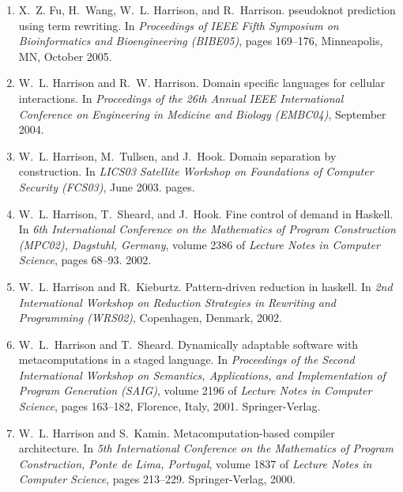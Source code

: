 \documentclass[12pt]{article} %
\begin{document}
\begin{enumerate}[leftmargin=0.0mm]
\item
X.~Z. Fu, H.~Wang, W.~L. Harrison, and R.~Harrison.
 pseudoknot prediction using term rewriting.
\newblock In {\em Proceedings of IEEE Fifth Symposium on Bioinformatics and
  Bioengineering (BIBE05)}, pages 169--176, Minneapolis, MN, October 2005.

\item
W.~L. Harrison and R.~W. Harrison.
\newblock Domain specific languages for cellular interactions.
\newblock In {\em Proceedings of the 26th Annual IEEE International Conference
  on Engineering in Medicine and Biology (EMBC04)}, September 2004.

\item
W.~L. Harrison, M.~Tullsen, and J.~Hook.
\newblock Domain separation by construction.
\newblock In {\em LICS03 Satellite Workshop on Foundations of Computer Security
  (FCS03)}, June 2003.
 pages.

\item
W.~L. Harrison, T.~Sheard, and J.~Hook.
\newblock Fine control of demand in {Haskell}.
\newblock In {\em 6th International Conference on the Mathematics of Program
  Construction (MPC02), Dagstuhl, Germany}, volume 2386 of {\em Lecture Notes in Computer Science}, pages 68--93. 2002.

\item
W.~L. Harrison and R.~Kieburtz.
\newblock Pattern-driven reduction in haskell.
\newblock In {\em 2nd International Workshop on Reduction Strategies in
  Rewriting and Programming (WRS02)}, Copenhagen, Denmark, 2002.



\item
W.~L.~Harrison and T.~Sheard.
\newblock Dynamically adaptable software with metacomputations in a staged
  language.
\newblock In {\em Proceedings of the Second International Workshop on
  Semantics, Applications, and Implementation of Program Generation (SAIG)},
  volume 2196 of {\em Lecture Notes in Computer Science}, pages 163--182,
  Florence, Italy, 2001. Springer-Verlag.


\item
W.~L. Harrison and S.~Kamin.
\newblock Metacomputation-based compiler architecture.
\newblock In {\em 5th International Conference on the Mathematics of Program
  Construction, Ponte de Lima, Portugal}, volume 1837 of {\em Lecture Notes in
  Computer Science}, pages 213--229. Springer-Verlag, 2000.



\end{enumerate}
\end{document}
